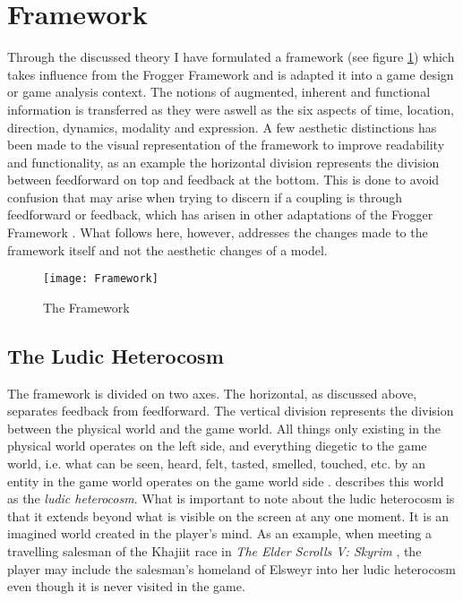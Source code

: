 \section{Framework}
Through the discussed theory I have formulated a framework (see figure \ref{framework}) which takes influence from the Frogger Framework \cite{frogger} and is adapted it into a game design or game analysis context. The notions of augmented, inherent and functional information is transferred as they were aswell as the six aspects of time, location, direction, dynamics, modality and expression. A few aesthetic distinctions has been made to the visual representation of the framework to improve readability and functionality, as an example the horizontal division represents the division between feedforward on top and feedback at the bottom. This is done to avoid confusion that may arise when trying to discern if a coupling is through feedforward or feedback, which has arisen in other adaptations of the Frogger Framework \cite{tangifrog}. What follows here, however, addresses the changes made to the framework itself and not the aesthetic changes of a model.

\begin{figure}
  \texttt{[image: Framework]}
  \caption{The Framework}
  \label{framework}
\end{figure}

\subsection{The Ludic Heterocosm}
The framework is divided on two axes. The horizontal, as discussed above, separates feedback from feedforward. The vertical division represents the division between the physical world and the game world. All things only existing in the physical world operates on the left side, and everything diegetic to the game world, i.e. what can be seen, heard, felt, tasted, smelled, touched, etc. by an entity in the game world operates on the game world side \cite{bordwell}.  describes this world as the \textit{ludic heterocosm}. What is important to note about the ludic heterocosm is that it extends beyond what is visible on the screen at any one moment. It is an imagined world created in the player's mind. As an example, when meeting a travelling salesman of the Khajiit race in \textit{The Elder Scrolls V: Skyrim} \cite{skyrim}, the player may include the salesman's homeland of Elsweyr into her ludic heterocosm even though it is never visited in the game.

